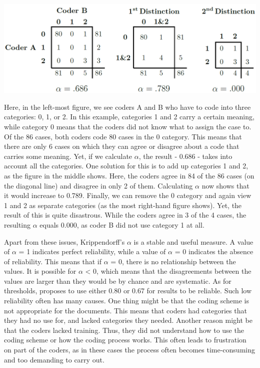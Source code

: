 \documentclass[
]{article}
\begin{document}
\begin{center}\includegraphics[width=0.75\linewidth]{figures/kripp} \end{center}

Here, in the left-most figure, we see coders A and B who have to code into three categories: 0, 1, or 2. In this example, categories 1 and 2 carry a certain meaning, while category 0 means that the coders did not know what to assign the case to. Of the 86 cases, both coders code 80 cases in the 0 category. This means that there are only 6 cases on which they can agree or disagree about a code that carries some meaning. Yet, if we calculate \(\alpha\), the result - 0.686 - takes into account all the categories. One solution for this is to add up categories 1 and 2, as the figure in the middle shows. Here, the coders agree in 84 of the 86 cases (on the diagonal line) and disagree in only 2 of them. Calculating \(\alpha\) now shows that it would increase to 0.789. Finally, we can remove the 0 category and again view 1 and 2 as separate categories (as the most right-hand figure shows). Yet, the result of this is quite disastrous. While the coders agree in 3 of the 4 cases, the resulting \(\alpha\) equals 0.000, as coder B did not use category 1 at all.

Apart from these issues, Krippendorff's \(\alpha\) is a stable and useful measure. A value of \(\alpha\) = 1 indicates perfect reliability, while a value of \(\alpha\) = 0 indicates the absence of reliability. This means that if \(\alpha\) = 0, there is no relationship between the values. It is possible for \(\alpha\) \textless{} 0, which means that the disagreements between the values are larger than they would be by chance and are systematic. As for thresholds, \textcite{Krippendorff2004a} proposes to use either 0.80 or 0.67 for results to be reliable. Such low reliability often has many causes. One thing might be that the coding scheme is not appropriate for the documents. This means that coders had categories that they had no use for, and lacked categories they needed. Another reason might be that the coders lacked training. Thus, they did not understand how to use the coding scheme or how the coding process works. This often leads to frustration on part of the coders, as in these cases the process often becomes time-consuming and too demanding to carry out.
\end{document}
